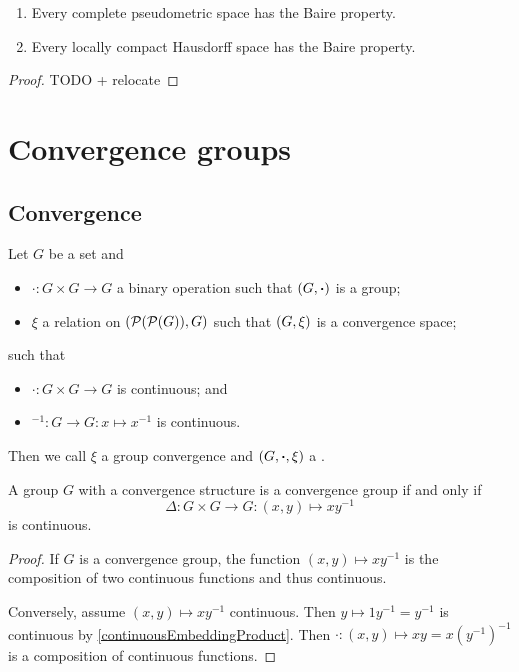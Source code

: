 \begin{theorem} \label{BaireCategory} \hspace{1em}
\begin{enumerate}
\item Every complete pseudometric space has the Baire property.
\item Every locally compact Hausdorff space has the Baire property.
\end{enumerate}
\end{theorem}
\begin{proof}
TODO + relocate
\end{proof}

\chapter{Convergence groups}
\section{Convergence}
\begin{definition}
Let $G$ be a set and
\begin{itemize}
\item $\boldsymbol{\cdot}: G\times G \to G$ a binary operation such that $\sSet{G, \boldsymbol{\cdot}}$ is a group;
\item $\xi$ a relation on $(\operatorname{\mathcal{P}}(\operatorname{\mathcal{P}}(G)), G)$ such that $\sSet{G, \xi}$ is a convergence space;
\end{itemize}
such that
\begin{itemize}
\item $\boldsymbol{\cdot}: G\times G \to G$ is continuous; and
\item $^{-1}: G\to G: x\mapsto x^{-1}$ is continuous.
\end{itemize}
Then we call $\xi$ a group convergence and $\sSet{G, \boldsymbol{\cdot}, \xi}$ a .
\end{definition}

\begin{lemma} \label{convergenceGroupCriterion}
A group $G$ with a convergence structure is a convergence group \textup{if and only if}
\[ \Delta: G\times G \to G: (x,y) \mapsto xy^{-1} \]
is continuous.
\end{lemma}
\begin{proof}
If $G$ is a convergence group, the function $(x,y) \mapsto xy^{-1}$ is the composition of two continuous functions and thus continuous.

Conversely, assume $(x,y) \mapsto xy^{-1}$ continuous. Then $y \mapsto 1y^{-1} = y^{-1}$ is continuous by \ref{continuousEmbeddingProduct}. Then $\boldsymbol{\cdot}: (x,y) \mapsto xy = x(y^{-1})^{-1}$ is a composition of continuous functions.
\end{proof}

